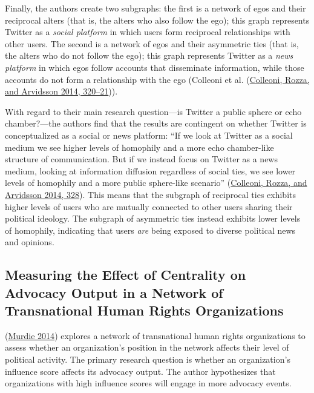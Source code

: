 \documentclass{book}
\begin{document}
Finally, the authors create two subgraphs: the first is a network of egos and
their reciprocal alters (that is, the alters who also follow the ego); this
graph represents Twitter as a \emph{social platform} in which users form
reciprocal relationships with other users. The second is a network of egos and
their asymmetric ties (that is, the alters who do not follow the ego); this
graph represents Twitter as a \emph{news platform} in which egos follow
accounts that disseminate information, while those accounts do not form a
relationship with the ego (Colleoni et al.
(\protect\hyperlink{ref-ColleoniEtAl2014}{Colleoni, Rozza, and Arvidsson 2014,
320--21})).

With regard to their main research question---is Twitter a public sphere or
echo chamber?---the authors find that the results are contingent on whether
Twitter is conceptualized as a social or news platform: ``If we look at
Twitter as a social medium we see higher levels of homophily and a more echo
chamber-like structure of communication. But if we instead focus on Twitter as
a news medium, looking at information diffusion regardless of social ties, we
see lower levels of homophily and a more public sphere-like scenario''
(\protect\hyperlink{ref-ColleoniEtAl2014}{Colleoni, Rozza, and Arvidsson 2014,
328}). This means that the subgraph of reciprocal ties exhibits higher levels
of users who are mutually connected to other users sharing their political
ideology. The subgraph of asymmetric ties instead exhibits lower levels of
homophily, indicating that users \emph{are} being exposed to diverse political
news and opinions.

\hypertarget{measuring-the-effect-of-centrality-on-advocacy-output-in-a-network-of-transnational-human-rights-organizations}{%
\subsection{Measuring the Effect of Centrality on Advocacy Output in a Network
of Transnational Human Rights
Organizations}\label{measuring-the-effect-of-centrality-on-advocacy-output-in-a-network-of-transnational-human-rights-organizations}}

(\protect\hyperlink{ref-Murdie2014}{Murdie 2014}) explores a network of
transnational human rights organizations to assess whether an organization's
position in the network affects their level of political activity. The primary
research question is whether an organization's influence score affects its
advocacy output. The author hypothesizes that organizations with high
influence scores will engage in more advocacy events.
\end{document}
